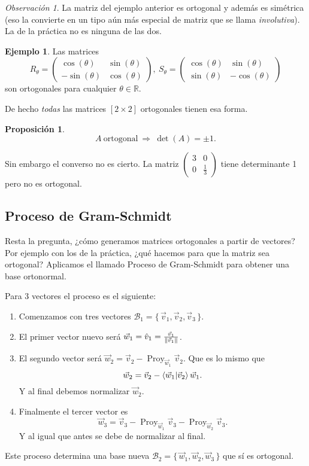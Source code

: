 \documentclass[12pt]{article}
\theoremstyle{plain}
\newtheorem{Prop}[Th]{Proposición}     %
\theoremstyle{definition}
\newtheorem{Ex}[Th]{Ejemplo}           %
\theoremstyle{remark}
\newtheorem*{Rmk}{Observación}      %
\DeclareMathOperator{\Proy}{Proy}   %
\newcommand{\te}{\theta}                %
\newcommand{\bR}{\mathbb{R}}        %
\newcommand{\cB}{\mathcal{B}}       %
\newcommand{\x}{\times}             %
\renewcommand{\:}{\colon}           %
\renewcommand{\.}{\Cdot}                %
\newcommand{\twobytwo}[4]{\begin{pmatrix} %
  #1 & #2 \\ #3 & #4 \end{pmatrix}}
\newcommand{\To}{\Rightarrow}
\newcommand{\set}[1]{\{\,#1\,\}}    %
\begin{document}
\begin{multicols}{2}
\begin{Rmk}
  La matriz del ejemplo anterior es ortogonal y además es simétrica (eso la convierte en un tipo aún más especial de matriz que se llama \emph{involutiva}). La de la práctica no es ninguna de las dos. 
\end{Rmk}

\begin{Ex}
  Las matrices 
  $$R_\te=\twobytwo{\cos(\te)}{\sin(\te)}{-\sin(\te)}{\cos(\te)},\ S_\te=\twobytwo{\cos(\te)}{\sin(\te)}{\sin(\te)}{-\cos(\te)}$$
  son ortogonales para cualquier $\te\in\bR$.\par 
  De hecho \emph{todas} las matrices $[2\x 2]$ ortogonales tienen esa forma.
\end{Ex}

\begin{Prop}
  $$A\ \text{ortogonal}\ \To\ \det(A)=\pm 1.$$
\end{Prop}

Sin embargo el converso no es cierto. La matriz $\twobytwo{3}{0}{0}{\frac13}$ tiene determinante 1 pero no es ortogonal.

\subsection*{Proceso de Gram-Schmidt}

Resta la pregunta, ¿cómo generamos matrices ortogonales a partir de vectores? Por ejemplo con los de la práctica, ¿qué hacemos para que la matriz sea ortogonal? Aplicamos el llamado Proceso de Gram-Schmidt para obtener una base ortonormal.\par 
Para 3 vectores el proceso es el siguiente:
\begin{enumerate}
  \itemsep=-0.42em
  \item Comenzamos con tres vectores $\cB_1=\set{\vec{v}_1,\vec{v}_2,\vec{v}_3}$.
  \item El primer vector nuevo será $\vec{w}_1=\hat{v}_1=\frac{\vec{v}_1}{\norm{\vec{v}_1}}$.
  \item El segundo vector será $\vec{w}_2=\vec{v}_2-\Proy_{\vec{w}_1}\vec{v}_2$. Que es lo mismo que 
  $$\vec{w}_2=\vec{v}_2-\braket{\vec{w}_1}{\vec{v}_2}\vec{w}_1.$$
  Y al final debemos normalizar $\vec{w}_2$.
  \item Finalmente el tercer vector es 
  $$\vec{w}_3=\vec{v}_3-\Proy_{\vec{w}_1}\vec{v}_3-\Proy_{\vec{w}_2}\vec{v}_3.$$
  Y al igual que antes se debe de normalizar al final.
\end{enumerate}
Este proceso determina una base nueva $\cB_2=\set{\vec{w}_1,\vec{w}_2,\vec{w}_3}$ que sí es ortogonal. 


\end{multicols}
\end{document}
